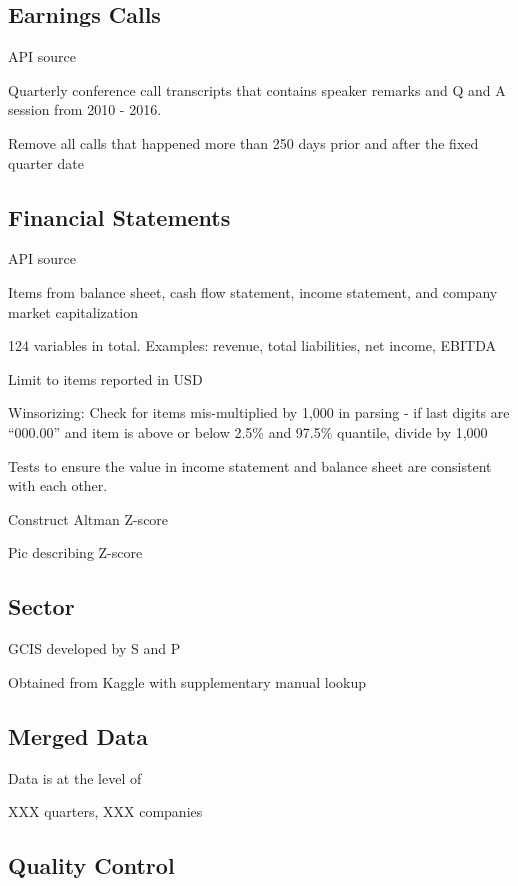 \documentclass{article}
\begin{document}
    \subsection*{Earnings Calls}

    API source

    Quarterly conference call transcripts that contains speaker remarks and Q and A session from 2010 - 2016.

    Remove all calls that happened more than 250 days prior and after the fixed quarter date

    \subsection*{Financial Statements}

    API source

    Items from balance sheet, cash flow statement, income statement, and company market capitalization
    
    124 variables in total. Examples: revenue, total liabilities, net income, EBITDA
    
    Limit to items reported in USD
    
    Winsorizing: Check for items mis-multiplied by 1,000 in parsing - if last digits are “000.00” and item is above or below 2.5\% and 97.5\% quantile, divide by 1,000

    Tests to ensure the value in income statement and balance sheet are consistent with each other.

    Construct Altman Z-score

    Pic describing Z-score

    \subsection*{Sector}

    GCIS developed by S and P

    Obtained from Kaggle with supplementary manual lookup

    \subsection*{Merged Data}

    Data is at the level of

    XXX quarters, XXX companies

    \subsection*{Quality Control}
\end{document}
